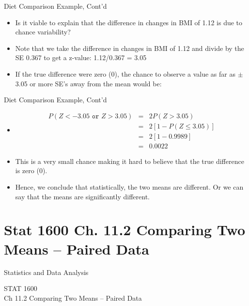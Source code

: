 \documentclass[14pt]{beamer}\usepackage[]{graphicx}\usepackage[]{color}
\begin{document}
\begin{frame}[fragile]{Diet Comparison Example, Cont'd}

\begin{itemize}
\item Is it viable to explain that the difference in changes in BMI of 1.12 is  due to chance variability?
\item Note that we take the difference in changes in BMI of 1.12 and divide by the SE 0.367 to get a z-value: 1.12/0.367 = 3.05 
\item If the true difference were zero (0), the chance to observe a value as far as $\pm$ 3.05 or more SE's away from the mean would be:
\end{itemize}
\end{frame}

\begin{frame}[fragile]{Diet Comparison Example, Cont'd}

{\small{
\begin{itemize}
\item 
\begin{eqnarray*}
P(Z < -3.05 \texttt{ or } Z > 3.05) &=& 2 P(Z > 3.05) \\
  &=& 2 [1 - P(Z \le 3.05)] \\
  &=& 2 [1 - 0.9989] \\
  &=& 0.0022
\end{eqnarray*}

\item This is a very small chance making it hard to believe that the true difference is zero (0). 
\item Hence, we conclude that statistically, the two means are different.  Or we can say that the means are significantly different.
\end{itemize}
}}
\end{frame}



\section{Stat 1600 Ch. 11.2  Comparing Two Means -- Paired Data}

\begin{frame}[fragile]{Statistics and Data Analysis}

STAT 1600 \\ Ch 11.2 Comparing Two Means -- Paired Data

\end{frame}
\end{document}
